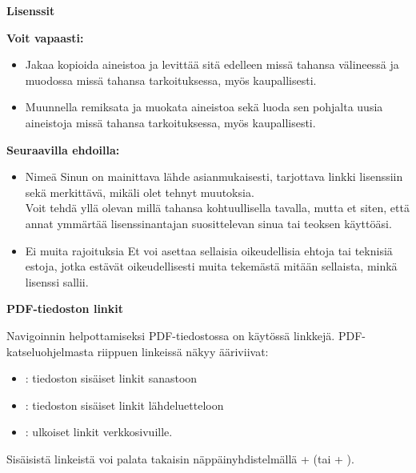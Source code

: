
\pagestyle{empty}

{\large\textbf{Lisenssit}}



\textbf{Voit vapaasti:}
\begin{itemize}
  \item Jakaa {\textemdash} kopioida aineistoa ja levittää sitä edelleen missä tahansa välineessä ja muodossa missä tahansa tarkoituksessa, myös kaupallisesti.
  \item Muunnella {\textemdash} remiksata ja muokata aineistoa sekä luoda sen pohjalta uusia aineistoja missä tahansa tarkoituksessa, myös kaupallisesti.
\end{itemize}

\textbf{Seuraavilla ehdoilla:}
\begin{itemize}
  \item Nimeä {\textemdash} Sinun on mainittava lähde asianmukaisesti, tarjottava linkki lisenssiin sekä merkittävä, mikäli olet tehnyt muutoksia.\\ Voit tehdä yllä olevan millä tahansa kohtuullisella tavalla, mutta et siten, että annat ymmärtää lisenssinantajan suosittelevan sinua tai teoksen käyttöäsi.
  \item Ei muita rajoituksia {\textemdash} Et voi asettaa sellaisia oikeudellisia ehtoja tai teknisiä estoja, jotka estävät oikeudellisesti muita tekemästä mitään sellaista, minkä lisenssi sallii.
\end{itemize}
\bigskip
{\large\textbf{PDF-tiedoston linkit}}

Navigoinnin helpottamiseksi PDF-tiedostossa on käytössä linkkejä. PDF-katseluohjelmasta riippuen linkeissä näkyy ääriviivat:

\begin{itemize}
  \item{}: tiedoston sisäiset linkit sanastoon
  \item{}: tiedoston sisäiset linkit lähdeluetteloon
  \item {}: ulkoiset linkit verkkosivuille.
\end{itemize}

\noindent Sisäisistä linkeistä voi palata takaisin näppäinyhdistelmällä + 
(tai + ).
\restoregeometry
\clearpage
